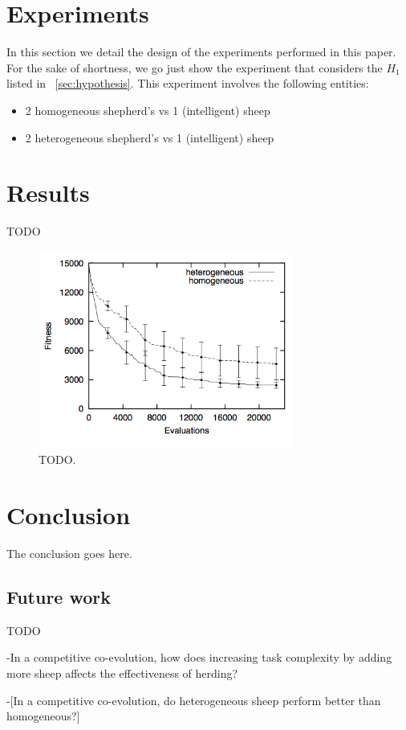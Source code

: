 \documentclass[conference]{IEEEtran}
\begin{document}
\section{Experiments}
In this section we detail the design of the experiments performed in this paper.
For the sake of shortness, we go just show the experiment that considers the $H_1$ listed in ~\ref{sec:hypothesis}.
This experiment involves the following entities:

\begin{itemize}
	\item 2 homogeneous shepherd’s vs 1 (intelligent) sheep
	\item 2 heterogeneous shepherd’s vs 1 (intelligent) sheep
\end{itemize}


\section{Results}
TODO

\begin{figure}[t]
\centering
\includegraphics[width=3.3in]{imgs/homo_vs_hetero.png}
\caption{TODO.}
\label{fig:homo_vs_hetero}
\end{figure}

\section{Conclusion}
The conclusion goes here.

\subsection{Future work}
TODO

-In a competitive co-evolution, how does increasing task complexity by adding more sheep affects the effectiveness of herding? %

-[In a competitive co-evolution, do heterogeneous sheep perform better than homogeneous?] %





\end{document}
